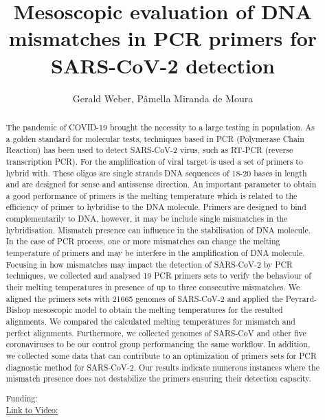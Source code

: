 \documentclass[twoside]{article}
\title{\vspace{-15mm}\fontsize{24pt}{10pt}\selectfont\textbf{ Mesoscopic evaluation of DNA mismatches in PCR primers for SARS-CoV-2 detection }} %
\author{ Gerald Weber,  P\^amella Miranda de Moura }
\affil{ UNIVERSIDADE FEDERAL DE MINAS GERAIS,  UFMG - Departamento de F\'{\i}sica }
\date{}
\begin{document}
  
  
  \maketitle %
  
  
  \thispagestyle{fancy} %
  
  
  \begin{abstract}
  The pandemic of COVID-19 brought the necessity to a large testing in population. As a golden standard for molecular tests,  techniques based in PCR (Polymerase Chain Reaction) has been used to detect SARS-CoV-2 virus,  such as RT-PCR (reverse transcription PCR). For the amplification of viral target is used a set of primers to hybrid with. These oligos are single strands DNA sequences of 18-20 bases in length and are designed for sense and antissense direction. An important parameter to obtain a good performance of primers is the melting temperature which is related to the efficiency of primer to hybridise to the DNA molecule. Primers are designed to bind complementarily to DNA,  however,  it may be include single mismatches in the hybridisation. Mismatch presence can influence in the stabilisation of DNA molecule. In the case of PCR process,  one or more mismatches can change the melting temperature of primers and may be interfere in the amplification of DNA molecule. Focusing in how mismatches may impact the detection of SARS-CoV-2 by PCR techniques,  we collected and analysed 19 PCR primers sets to verify the behaviour of their melting temperatures in presence of up to three consecutive mismatches. We aligned the primers sets with 21665 genomes of SARS-CoV-2 and applied the Peyrard-Bishop mesoscopic model to obtain the melting temperatures for the resulted alignments. We compared the calculated melting temperatures for mismatch and perfect alignments. Furthermore,  we collected genomes of SARS-CoV and other five coronaviruses to be our control group performancing the same workflow. In addition,  we collected some data that can contribute to an optimization of primers sets for PCR diagnostic method for SARS-CoV-2. Our results indicate numerous instances where the mismatch presence does not destabilize the primers ensuring their detection capacity.
  
  Funding:   \\
  \href{http://ab3c.org.br/xpress_pres2020/xmxp2020-297987.html}{Link to Video:}

  \end{abstract}
   
  
\end{document}
